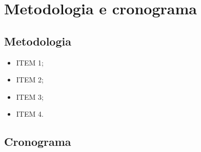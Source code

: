 \documentclass[_ArquivoPrincipal.tex]{subfiles}
\begin{document}
	
\chapter{Metodologia e cronograma}


\section{Metodologia}

\begin{itemize}
    \item ITEM 1;

    \item ITEM 2;

    \item ITEM 3;

    \item ITEM 4.

\end{itemize}

\section{Cronograma}
	
\end{document}
